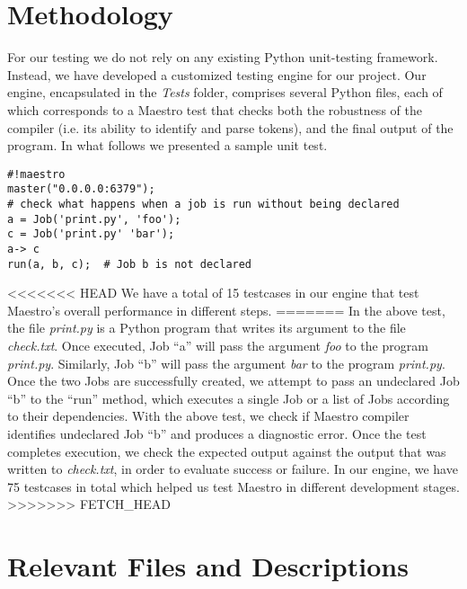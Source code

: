 \section{Methodology}
For our testing we do not rely on any existing Python unit-testing framework.
Instead, we have developed a customized testing engine for our project.
Our engine, encapsulated in the \textit{Tests} folder, comprises several Python
files, each of which corresponds to a Maestro test that checks both the
robustness of the compiler (i.e. its ability to identify and parse tokens),
and the final output of the program.
In what follows we presented a sample unit test.

\begin{center}
\begin{verbatim}
#!maestro
master("0.0.0.0:6379");
# check what happens when a job is run without being declared
a = Job('print.py', 'foo');
c = Job('print.py' 'bar');
a-> c
run(a, b, c);  # Job b is not declared
\end{verbatim}
\end{center}


<<<<<<< HEAD
We have a total of 15 testcases in our engine that test Maestro's  overall performance in different steps.
=======
In the above test, the file \textit{print.py} is a Python program that writes
its argument to the file \textit{check.txt}. Once executed, Job ``a'' will
pass the argument \textit{foo} to the program \textit{print.py}. Similarly,
Job ``b'' will
pass the argument \textit{bar} to the program \textit{print.py}.
Once the two Jobs are successfully created, we attempt to pass an undeclared
Job ``b'' to the ``run'' method, which executes a single Job or a list of Jobs
according to their dependencies. With the above test, we check if
Maestro compiler identifies undeclared Job ``b'' and produces a diagnostic
error. Once the test completes execution, we check the expected output against
the output that was written to \textit{check.txt}, in order to evaluate success
or failure. In our engine, we have 75 testcases in total which helped us test
Maestro in different development stages.
>>>>>>> FETCH_HEAD

\section{Relevant Files and Descriptions}

